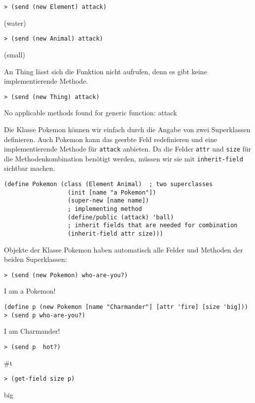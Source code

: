 \begin{lstlisting}
> (send (new Element) attack)
\end{lstlisting}
{\rsymbol (water)}

\begin{lstlisting}
> (send (new Animal) attack)
\end{lstlisting}
{\rsymbol (small)}

An Thing lässt sich die Funktion nicht aufrufen, denn es gibt keine implementierende Methode.

\begin{lstlisting}
> (send (new Thing) attack)
\end{lstlisting}
{\rerror No applicable methods found for generic function: attack}

Die Klasse Pokemon können wir einfach durch die Angabe von zwei Superklassen definieren. Auch Pokemon kann das geerbte Feld redefinieren und eine implementierende Methode für \texttt{attack} anbieten. Da die Felder \texttt{attr} und \texttt{size} für die Methodenkombination benötigt werden, müssen wir sie mit \texttt{inherit-field} sichtbar machen.

\begin{lstlisting}
(define Pokemon (class (Element Animal)  ; two superclasses
                  (init [name "a Pokemon"])
                  (super-new [name name])
                  ; implementing method
                  (define/public (attack) 'ball)
                  ; inherit fields that are needed for combination
                  (inherit-field attr size)))
\end{lstlisting}

Objekte der Klasse Pokemon haben automatisch alle Felder und Methoden der beiden Superklassen:

\begin{lstlisting}
> (send (new Pokemon) who-are-you?)
\end{lstlisting}
{\routput {\qq}I am a Pokemon!\qq}

\begin{lstlisting}
(define p (new Pokemon [name "Charmander"] [attr 'fire] [size 'big]))
> (send p who-are-you?)
\end{lstlisting}
{\routput {\qq}I am Charmander!\qq}

\begin{lstlisting}
> (send p  hot?)
\end{lstlisting}
{\routput \#t}

\begin{lstlisting}
> (get-field size p)
\end{lstlisting}
{\rsymbol big}

